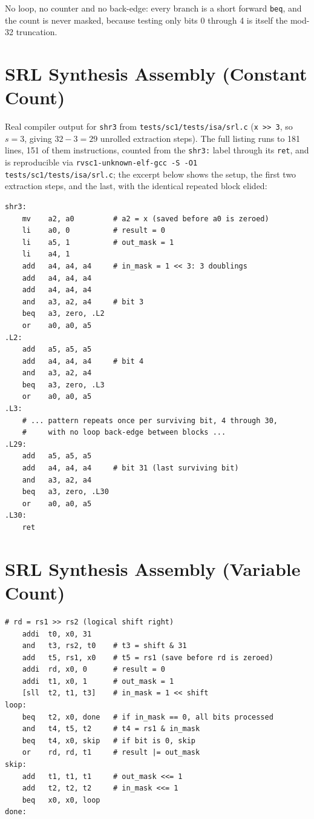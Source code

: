 No loop, no counter and no back-edge: every branch is a short forward \texttt{beq}, and the count is
never masked, because testing only bits 0 through 4 is itself the mod-32 truncation.


\chapter{SRL Synthesis Assembly (Constant Count)} \label{apx:srl-const-asm}

Real compiler output for \texttt{shr3} from \nolinkurl{tests/sc1/tests/isa/srl.c} (\texttt{x >> 3}, so
$s = 3$, giving $32-3 = 29$ unrolled extraction steps). The full listing runs to 181 lines, 151 of
them instructions, counted from the \texttt{shr3:} label through its \texttt{ret}, and is reproducible
via \nolinkurl{rvsc1-unknown-elf-gcc -S -O1 tests/sc1/tests/isa/srl.c}; the excerpt below shows the
setup, the first two extraction steps, and the last, with the identical repeated block elided:

\begin{lstlisting}
shr3:
    mv    a2, a0         # a2 = x (saved before a0 is zeroed)
    li    a0, 0          # result = 0
    li    a5, 1          # out_mask = 1
    li    a4, 1
    add   a4, a4, a4     # in_mask = 1 << 3: 3 doublings
    add   a4, a4, a4
    add   a4, a4, a4
    and   a3, a2, a4     # bit 3
    beq   a3, zero, .L2
    or    a0, a0, a5
.L2:
    add   a5, a5, a5
    add   a4, a4, a4     # bit 4
    and   a3, a2, a4
    beq   a3, zero, .L3
    or    a0, a0, a5
.L3:
    # ... pattern repeats once per surviving bit, 4 through 30,
    #     with no loop back-edge between blocks ...
.L29:
    add   a5, a5, a5
    add   a4, a4, a4     # bit 31 (last surviving bit)
    and   a3, a2, a4
    beq   a3, zero, .L30
    or    a0, a0, a5
.L30:
    ret
\end{lstlisting}


\chapter{SRL Synthesis Assembly (Variable Count)} \label{apx:srl-asm}

\begin{lstlisting}
# rd = rs1 >> rs2 (logical shift right)
    addi  t0, x0, 31
    and   t3, rs2, t0    # t3 = shift & 31
    add   t5, rs1, x0    # t5 = rs1 (save before rd is zeroed)
    addi  rd, x0, 0      # result = 0
    addi  t1, x0, 1      # out_mask = 1
    [sll  t2, t1, t3]    # in_mask = 1 << shift
loop:
    beq   t2, x0, done   # if in_mask == 0, all bits processed
    and   t4, t5, t2     # t4 = rs1 & in_mask
    beq   t4, x0, skip   # if bit is 0, skip
    or    rd, rd, t1     # result |= out_mask
skip:
    add   t1, t1, t1     # out_mask <<= 1
    add   t2, t2, t2     # in_mask <<= 1
    beq   x0, x0, loop
done:
\end{lstlisting}


